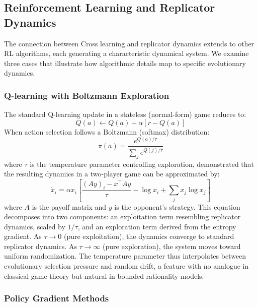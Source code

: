 \subsection{Reinforcement Learning and Replicator Dynamics}

The connection between Cross learning and replicator dynamics extends to other RL algorithms, each generating a characteristic dynamical system. We examine three cases that illustrate how algorithmic details map to specific evolutionary dynamics.

\subsubsection{Q-learning with Boltzmann Exploration}

The standard Q-learning update in a stateless (normal-form) game reduces to:
\begin{equation}
Q(a) \leftarrow Q(a) + \alpha\left[r - Q(a)\right]
\end{equation}
When action selection follows a Boltzmann (softmax) distribution:
\begin{equation}
\pi(a) = \frac{e^{Q(a)/\tau}}{\sum_j e^{Q(j)/\tau}}
\end{equation}
where $\tau$ is the temperature parameter controlling exploration, \citet{Tuyls2003} demonstrated that the resulting dynamics in a two-player game can be approximated by:
\begin{equation}
\dot{x}_i = \alpha x_i\left[\frac{(Ay)_i - x^{\top}Ay}{\tau} - \log x_i + \sum_j x_j\log x_j\right]
\end{equation}
where $A$ is the payoff matrix and $y$ is the opponent's strategy. This equation decomposes into two components: an exploitation term resembling replicator dynamics, scaled by $1/\tau$, and an exploration term derived from the entropy gradient. As $\tau \rightarrow 0$ (pure exploitation), the dynamics converge to standard replicator dynamics. As $\tau \rightarrow \infty$ (pure exploration), the system moves toward uniform randomization. The temperature parameter thus interpolates between evolutionary selection pressure and random drift, a feature with no analogue in classical game theory but natural in bounded rationality models.

\subsubsection{Policy Gradient Methods}


